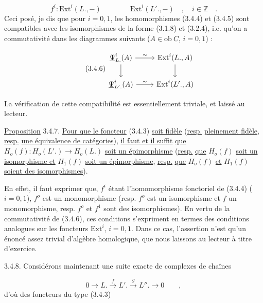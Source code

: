 \begin{equation}\tag{3.4.5}
f^i : \mathrm{Ext}^i(L.,-) \qquad\qquad \mathrm{Ext}^i(L'.,-) \quad , \quad i \in \mathbb{Z} \quad .
\end{equation}
Ceci posé, je dis que pour $i=0,1$, les homomorphismes (3.4.4) et (3.4.5) sont compatibles avec les isomorphismes de la forme (3.1.8) et (3.2.4), i.e. qu'on a commutativité dans les diagrammes suivants ($A \in \mathrm{ob}\ \underline{C}$, $i=0,1$) :

\begin{equation}\tag{3.4.6}
\begin{tikzcd}
\underline{\Psi}^i_{L.}(A) \arrow[r, "\sim"] \arrow[d] & \mathrm{Ext}^i(L.,A) \arrow[d] \\
\underline{\Psi}^i_{L'.}(A) \arrow[r, "\sim"] & \mathrm{Ext}^i(L'.,A)
\end{tikzcd}
\end{equation}


La vérification de cette compatibilité est essentiellement triviale, et laissé au lecteur.

\underline{Proposition} 3.4.7. \underline{Pour que le foncteur} (3.4.3) \underline{soit fidèle} (\underline{resp.} \underline{pleinement fidèle}, \underline{resp.} \underline{une équivalence de catégories}), \underline{il faut et il suffit} \underline{que} $H_o(f) : H_o(L'.) \longrightarrow H_o(L.)$ \underline{soit un épimorphisme} (\underline{resp.} \underline{que} $H_o(f)$ \underline{soit un isomorphisme et} $H_1(f)$ \underline{soit un épimorphisme}, \underline{resp.} \underline{que} $H_o(f)$ \underline{et} $H_1(f)$ \underline{soient des isomorphismes}).

En effet, il faut exprimer que, $f^i$ étant l'homomorphisme fonctoriel de (3.4.4) ($i=0,1$), $f^o$ est un monomorphisme (resp. $f^o$ est un isomorphisme et $f$ un monomorphisme, resp. $f^o$ et $f^1$ sont des isomorphismes). En vertu de la commutativité de (3.4.6), ces conditions s'expriment en termes des conditions analogues sur les foncteurs $\mathrm{Ext}^i$, $i=0,1$. Dans ce cas, l'assertion n'est qu'un énoncé assez trivial d'algèbre homologique, que nous laissons au lecteur à titre d'exercice.

3.4.8. Considérons maintenant une suite exacte de complexes de chaînes

\begin{equation}\tag{3.4.8.1}
0 \longrightarrow L. \xrightarrow{f} L'. \xrightarrow{g} L''. \longrightarrow 0 \qquad ,
\end{equation}
d'où des foncteurs du type (3.4.3)

